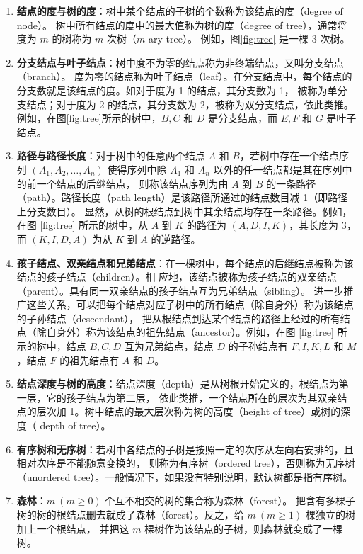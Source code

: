 \documentclass[lang=cn,newtx,10pt,scheme=chinese]{elegantbook}
\begin{document}
\begin{enumerate}
  \item \textbf{结点的度与树的度}：树中某个结点的子树的个数称为该结点的度（degree of node）。
  树中所有结点的度中的最大值称为树的度（degree of tree），通常将度为 $m$ 的树称为 $m$ 次树（$m$-ary tree）。
  例如，图\ref{fig:tree} 是一棵 3 次树。

  \item \textbf{分支结点与叶子结点}：树中度不为零的结点称为非终端结点，又叫分支结点（branch）。
  度为零的结点称为叶子结点（leaf）。在分支结点中，每个结点的分支数就是该结点的度。如对于度为 1 的结点，其分支数为 1，
  被称为单分支结点；对于度为 2 的结点，其分支数为 2，被称为双分支结点，依此类推。例如，在图\ref{fig:tree}所示的树中，$B, C$ 和 $D$ 是分支结点，而 $E, F$ 和 $G$ 是叶子结点。

  \item \textbf{路径与路径长度}：对于树中的任意两个结点 $A$ 和 $B$，若树中存在一个结点序列 $(A_1, A_2, \dots, A_n)$ 
  使得序列中除 $A_1$ 和 $A_n$ 以外的任一结点都是其在序列中的前一个结点的后继结点，
  则称该结点序列为由 $A$ 到 $B$ 的一条路径（path）。路径长度（path length）是该路径所通过的结点数目减 1（即路径上分支数目）。
  显然，从树的根结点到树中其余结点均存在一条路径。例如，在图 \ref{fig:tree} 所示的树中，从 $A$ 到 $K$ 的路径为 $(A, D, I, K)$，其长度为 3，而 $(K, I, D, A)$ 为从 $K$ 到 $A$ 的逆路径。

  \item \textbf{孩子结点、双亲结点和兄弟结点}：在一棵树中，每个结点的后继结点被称为该结点的孩子结点（children）。相
  应地，该结点被称为孩子结点的双亲结点（parent）。具有同一双亲结点的孩子结点互为兄弟结点（sibling）。
  进一步推广这些关系，可以把每个结点对应子树中的所有结点（除自身外）称为该结点的子孙结点（descendant），
  把从根结点到达某个结点的路径上经过的所有结点（除自身外）称为该结点的祖先结点（ancestor）。例如，在图 \ref{fig:tree} 所示的树中，结点 $B, C, D$ 互为兄弟结点，结点 $D$ 的子孙结点有 $F, I, K, L$ 和 $M$，结点 $F$ 的祖先结点有 $A$ 和 $D$。

  \item \textbf{结点深度与树的高度}：结点深度（depth）是从树根开始定义的，根结点为第一层，它的孩子结点为第二层，
  依此类推，一个结点所在的层次为其双亲结点的层次加 1。树中结点的最大层次称为树的高度（height of tree）或树的深度（
  depth of tree）。

  \item \textbf{有序树和无序树}：若树中各结点的子树是按照一定的次序从左向右安排的，且相对次序是不能随意变换的，
  则称为有序树（ordered tree），否则称为无序树（unordered tree）。一般情况下，如果没有特别说明，默认树都是指有序树。

  \item \textbf{森林}：$m \ (m \geq 0)$ 个互不相交的树的集合称为森林（forest）。
  把含有多棵子树的树的根结点删去就成了森林（forest）。反之，给 $m \ (m \geq 1)$ 棵独立的树加上一个根结点，
  并把这 $m$ 棵树作为该结点的子树，则森林就变成了一棵树。
\end{enumerate}
\end{document}
